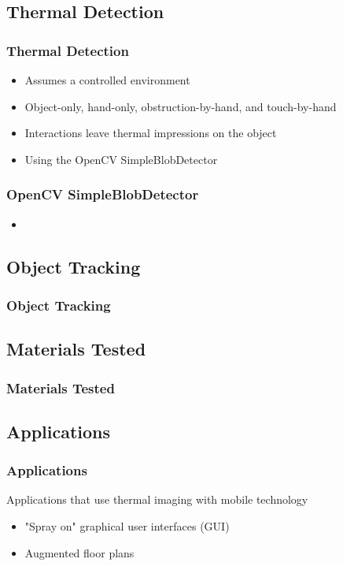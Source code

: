 \documentclass{beamer}
\begin{document}
\subsection{Thermal Detection}
\begin{frame}
\frametitle{Thermal Detection}
	\begin{itemize}
		\item Assumes a controlled environment
		\item Object-only, hand-only, obstruction-by-hand, and touch-by-hand
		\item Interactions leave thermal impressions on the object
		\item Using the OpenCV SimpleBlobDetector
	\end{itemize}
\end{frame}

\begin{frame}
\frametitle{OpenCV SimpleBlobDetector}
	\begin{itemize}
		\item 
	\end{itemize}
\end{frame}

\subsection{Object Tracking}
\begin{frame}	
\frametitle{Object Tracking}
\end{frame}

\subsection{Materials Tested}
\begin{frame}	
\frametitle{Materials Tested}
\end{frame}



\subsection{Applications}

\begin{frame}
	\frametitle{Applications}
	Applications that use thermal imaging with mobile technology 
	\begin{itemize}
		\item "Spray on" graphical user interfaces (GUI)
		\item Augmented floor plans
	\end{itemize}
\end{frame}
\end{document}
